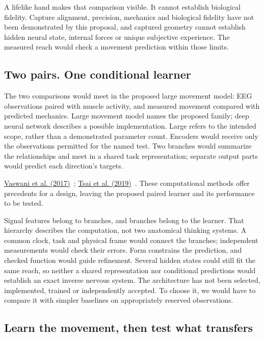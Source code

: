 A lifelike hand makes that comparison visible. It cannot establish biological
fidelity. Capture alignment, precision, mechanics and biological fidelity have
not been demonstrated by this proposal, and captured geometry cannot establish
hidden neural state, internal forces or unique subjective experience. The
measured reach would check a movement prediction within those limits.

\subsection{Two pairs. One conditional learner}
The two comparisons would meet in the proposed large movement model: EEG
observations paired with muscle activity, and measured movement compared
with predicted mechanics. Large movement model names the proposed family;
deep neural network describes a possible implementation. Large refers to
the intended scope, rather than a demonstrated parameter count. Encoders
would receive only the observations permitted for the named test. Two
branches would summarize the relationships and meet in a shared task
representation; separate output parts would predict each direction's targets.
\par\noindent \href{https://arxiv.org/html/1706.03762v7}{Vaswani et al. (2017)}~\cite{vaswani2017}; \href{https://aclanthology.org/P19-1656/}{Tsai et al. (2019)}~\cite{tsai2019}. These computational methods offer precedents for a design, leaving the proposed paired learner and its performance to be tested.

Signal features belong to branches, and branches belong to the learner.
That hierarchy describes the computation, not two anatomical thinking systems.
A common clock, task and physical frame would connect the branches; independent
measurements would check their errors. Form constrains the prediction, and
checked function would guide refinement. Several hidden states could still
fit the same reach, so neither a shared representation nor conditional
predictions would establish an exact inverse nervous system. The architecture
has not been selected, implemented, trained or independently accepted.
To choose it, we would have to compare it with simpler baselines on
appropriately reserved observations.

\subsection{Learn the movement, then test what transfers}

